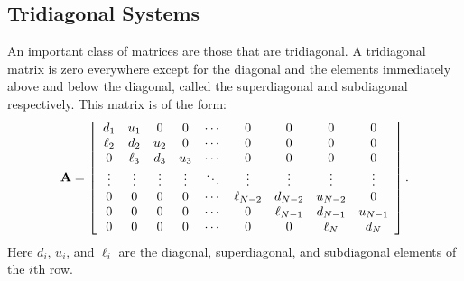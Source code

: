 \subsection{Tridiagonal Systems} \label{Sec:linearAlgebra_SystemsOfLinearEquations_TridiagonalSystems}

An important class of matrices are those that are tridiagonal. A tridiagonal matrix is zero everywhere except for the diagonal and the elements immediately above and below the diagonal, called the superdiagonal and subdiagonal respectively. This matrix is of the form:
\begin{align}
  \mathbf{A} = \left[ \begin{array}{c c c c c c c c c} 
  d_{1}    & u_{1}    & 0      & 0      & \cdots & 0          & 0          & 0        & 0       \\
  \ell_{2} & d_{2}    & u_{2}  & 0      & \cdots & 0          & 0          & 0        & 0       \\
  0        & \ell_{3} & d_{3}  & u_{3}  & \cdots & 0          & 0          & 0        & 0       \\
  \vdots   & \vdots   & \vdots & \vdots & \ddots & \vdots     & \vdots     & \vdots   & \vdots  \\
  0        & 0        & 0      & 0      & \cdots & \ell_{N-2} & d_{N-2}    & u_{N-2}  & 0       \\
  0        & 0        & 0      & 0      & \cdots & 0		  & \ell_{N-1} & d_{N-1}  & u_{N-1} \\ 
  0        & 0        & 0      & 0      & \cdots & 0          & 0          & \ell_{N} & d_{N}   \\ 
  \end{array} \right] . 
\end{align}
Here $d_i$, $u_i$, and $\ell_i$ are the diagonal, superdiagonal, and subdiagonal elements of the $i$th row.

